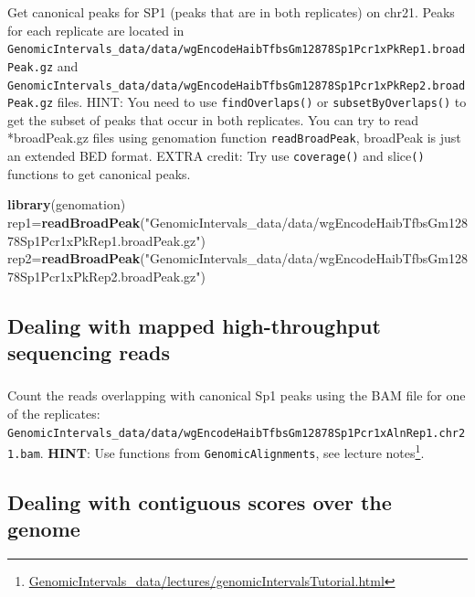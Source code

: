 \documentclass[12pt,]{krantz}
\newenvironment{Shaded}{\begin{snugshade}}{\end{snugshade}}
\newcommand{\KeywordTok}[1]{\textcolor[rgb]{0.13,0.29,0.53}{\textbf{#1}}}
\newcommand{\NormalTok}[1]{#1}
\newcommand{\StringTok}[1]{\textcolor[rgb]{0.31,0.60,0.02}{#1}}
\renewcommand{\href}[2]{#2\footnote{\url{#1}}}
\begin{document}
Get canonical peaks for SP1 (peaks that are in both replicates) on chr21. Peaks for each replicate are located in \texttt{GenomicIntervals\_data/data/wgEncodeHaibTfbsGm12878Sp1Pcr1xPkRep1.broadPeak.gz} and \texttt{GenomicIntervals\_data/data/wgEncodeHaibTfbsGm12878Sp1Pcr1xPkRep2.broadPeak.gz} files. HINT: You need to use \texttt{findOverlaps()} or \texttt{subsetByOverlaps()} to get the subset of peaks that occur in both replicates. You can try to read *broadPeak.gz files using genomation function \texttt{readBroadPeak}, broadPeak is just an extended BED format.
EXTRA credit: Try use \texttt{coverage()} and slice\texttt{()} functions to get canonical peaks.

\begin{Shaded}
\begin{Highlighting}[]
\KeywordTok{library}\NormalTok{(genomation)}
\NormalTok{rep1=}\KeywordTok{readBroadPeak}\NormalTok{(}\StringTok{"GenomicIntervals_data/data/wgEncodeHaibTfbsGm12878Sp1Pcr1xPkRep1.broadPeak.gz"}\NormalTok{)}
\NormalTok{rep2=}\KeywordTok{readBroadPeak}\NormalTok{(}\StringTok{"GenomicIntervals_data/data/wgEncodeHaibTfbsGm12878Sp1Pcr1xPkRep2.broadPeak.gz"}\NormalTok{)}
\end{Highlighting}
\end{Shaded}

\hypertarget{dealing-with-mapped-high-throughput-sequencing-reads-1}{%
\subsection{Dealing with mapped high-throughput sequencing reads}\label{dealing-with-mapped-high-throughput-sequencing-reads-1}}

\hypertarget{section-15}{%
\subsubsection{}\label{section-15}}

Count the reads overlapping with canonical Sp1 peaks using the BAM file for one of the replicates: \texttt{GenomicIntervals\_data/data/wgEncodeHaibTfbsGm12878Sp1Pcr1xAlnRep1.chr21.bam}. \textbf{HINT}:
Use functions from \texttt{GenomicAlignments}, see \href{GenomicIntervals_data/lectures/genomicIntervalsTutorial.html}{lecture notes}.

\hypertarget{dealing-with-contiguous-scores-over-the-genome}{%
\subsection{Dealing with contiguous scores over the genome}\label{dealing-with-contiguous-scores-over-the-genome}}
\end{document}
